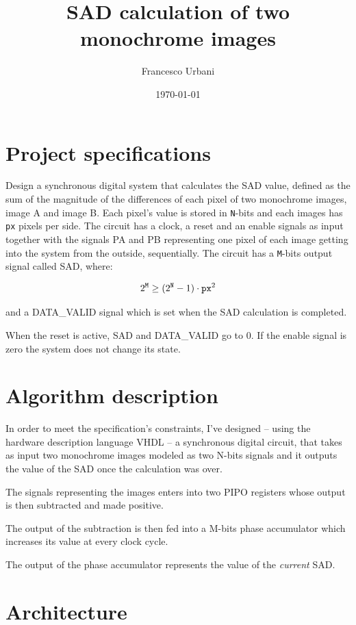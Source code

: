 \documentclass[12pt, a4paper]{article}
\title{SAD calculation of two monochrome images}
\author{Francesco Urbani}
\date{\today}
\begin{document}
\maketitle
\newpage
\tableofcontents
\newpage 
\listoffigures
\newpage

\section{Project specifications}


Design a synchronous digital system that calculates the SAD value, defined as the sum of the magnitude of the differences of each pixel of two monochrome images, image A and image B. Each pixel's value is stored in \texttt{N}-bits and each images has \texttt{px} pixels per side.
The circuit has a clock, a reset and an enable signals as input together with the signals PA and PB representing one pixel of each image getting into the system from the outside, sequentially.
The circuit has a \texttt{M}-bits output signal called SAD, where:

\begin{equation}
    2^\texttt{M} \ge (2^\texttt{N}-1) \cdot \mbox{\texttt{px}}^2
\end{equation}

and a DATA\_VALID signal which is set when the SAD calculation is completed.

When the reset is active, SAD and DATA\_VALID go to 0. If the enable signal is zero the system does not change its state.



\section{Algorithm description}
In order to meet the specification's constraints, I've designed -- using the hardware description language VHDL -- a synchronous digital circuit, that takes as input two monochrome images modeled as two N-bits signals and it outputs the value of the SAD once the calculation was over.

The signals representing the images enters into two PIPO registers whose output is then subtracted and made positive. 

The output of the subtraction is then fed into a M-bits phase accumulator which increases its value at every clock cycle.

The output of the phase accumulator represents the value of the \textit{current} SAD.


\section{Architecture}
\end{document}

